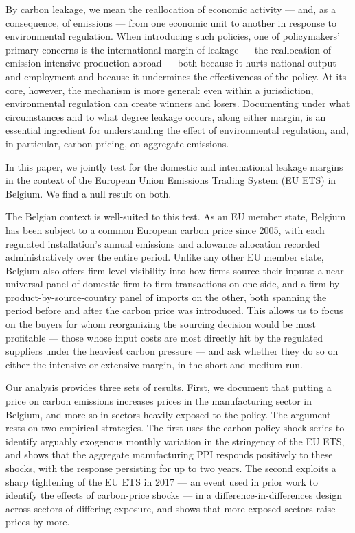 By carbon leakage, we mean the reallocation of economic activity — and, as a consequence, of emissions — from one economic unit to another in response to environmental regulation. When introducing such policies, one of policymakers' primary concerns is the international margin of leakage — the reallocation of emission-intensive production abroad — both because it hurts national output and employment and because it undermines the effectiveness of the policy. At its core, however, the mechanism is more general: even within a jurisdiction, environmental regulation can create winners and losers. Documenting under what circumstances and to what degree leakage occurs, along either margin, is an essential ingredient for understanding the effect of environmental regulation, and, in particular, carbon pricing, on aggregate emissions.

In this paper, we jointly test for the domestic and international leakage margins in the context of the European Union Emissions Trading System (EU ETS) in Belgium. We find a null result on both.

The Belgian context is well-suited to this test. As an EU member state, Belgium has been subject to a common European carbon price since 2005, with each regulated installation's annual emissions and allowance allocation recorded administratively over the entire period. Unlike any other EU member state, Belgium also offers firm-level visibility into how firms source their inputs: a near-universal panel of domestic firm-to-firm transactions on one side, and a firm-by-product-by-source-country panel of imports on the other, both spanning the period before and after the carbon price was introduced. This allows us to focus on the buyers for whom reorganizing the sourcing decision would be most profitable — those whose input costs are most directly hit by the regulated suppliers under the heaviest carbon pressure — and ask whether they do so on either the intensive or extensive margin, in the short and medium run.

Our analysis provides three sets of results. First, we document that putting a price on carbon emissions increases prices in the manufacturing sector in Belgium, and more so in sectors heavily exposed to the policy. The argument rests on two empirical strategies. The first uses the \citet{kanzig2023unequal} carbon-policy shock series to identify arguably exogenous monthly variation in the stringency of the EU ETS, and shows that the aggregate manufacturing PPI responds positively to these shocks, with the response persisting for up to two years. The second exploits a sharp tightening of the EU ETS in 2017 --- an event used in prior work to identify the effects of carbon-price shocks \citep{dejhonge2020,mulier2024overlapping} --- in a difference-in-differences design across sectors of differing exposure, and shows that more exposed sectors raise prices by more.

